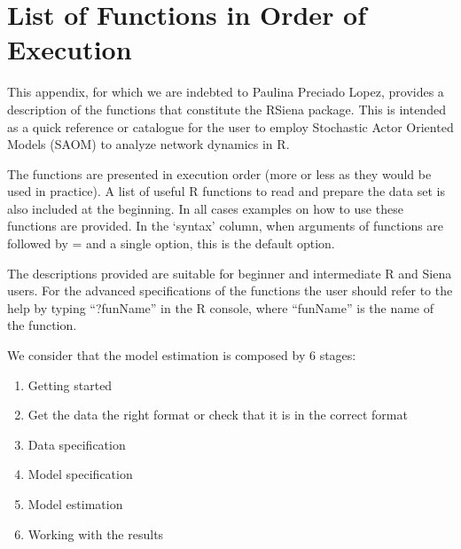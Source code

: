 \documentclass[a4paper,fleqn]{article}
\newcommand{\+}{\, + \,}
\newcommand{\R}{{\sf R }}
\newcommand{\Rn}{{\sf R}}
\newcommand{\RS}{{\sf RSiena }}
\begin{document}
{%


\appendix
\newpage
\section{List of Functions in Order of Execution}

    This appendix, for which we are indebted to Paulina Preciado Lopez,
    provides a description of the functions that constitute the
    \RS package. This is intended as a quick reference or catalogue for the
    user to employ Stochastic Actor Oriented Models (SAOM) to analyze network
    dynamics in \Rn.

    The functions are presented in execution order (more or less as
    they would be used in practice). A list of useful \R
    functions to read and prepare the data set is also included at the
    beginning. In all cases examples on how to use these functions are provided.
    In the `syntax' column,
    when arguments of functions are followed by = and a single option,
    this is the default option.

    The descriptions provided are suitable for beginner and intermediate \R and
    Siena users. For the advanced specifications of the functions the user
    should refer to the help by typing ``?funName'' in the \R console, where
    ``funName'' is the name of the function.

    We consider that the model estimation is composed by 6 stages:
\begin{enumerate}
    \item Getting started
    \item Get the data the right format or check that it is in the correct
      format
    \item Data specification
    \item Model specification
    \item   Model estimation
    \item   Working with the results
\end{enumerate}

}
\end{document}
